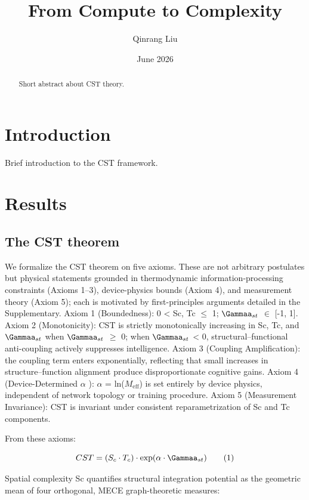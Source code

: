\documentclass[a4paper,12pt]{article}
\title{From Compute to Complexity}
\author{Qinrang Liu}
\date{June 2026}
\begin{document}
\maketitle
\begin{abstract}
Short abstract about CST theory.
\end{abstract}
\section{Introduction}
Brief introduction to the CST framework.

\section{Results}

\subsection{The CST theorem}

We formalize the CST theorem on five axioms.
These are not arbitrary postulates but physical statements grounded in thermodynamic information-processing constraints (Axioms 1--3), device-physics bounds (Axiom 4), and measurement theory (Axiom 5); each is motivated by first-principles arguments detailed in the Supplementary.
Axiom 1 (Boundedness): 0 < Sc, Tc $\leq$ 1; $\Gammaa_{st}$  $\in$  [-1, 1].
Axiom 2 (Monotonicity): CST is strictly monotonically increasing in Sc, Tc, and $\Gammaa_{st}$ when $\Gammaa_{st}$  $\geq$  0; when $\Gammaa_{st}$ < 0, structural--functional anti-coupling actively suppresses intelligence.
Axiom 3 (Coupling Amplification): the coupling term enters exponentially, reflecting that small increases in structure--function alignment produce disproportionate cognitive gains.
Axiom 4 (Device-Determined  $\alpha$ ):  $\alpha$  = ln($M_{\text{eff}}$) is set entirely by device physics, independent of network topology or training procedure.
Axiom 5 (Measurement Invariance): CST is invariant under consistent reparametrization of Sc and Tc components.

From these axioms:

\begin{equation}
CST = (S_c \cdot T_c) \cdot \exp(\alpha \cdot \Gammaa_{st}) \tag{1}
\end{equation}

Spatial complexity Sc quantifies structural integration potential as the geometric mean of four orthogonal, MECE graph-theoretic measures:
\end{document}
